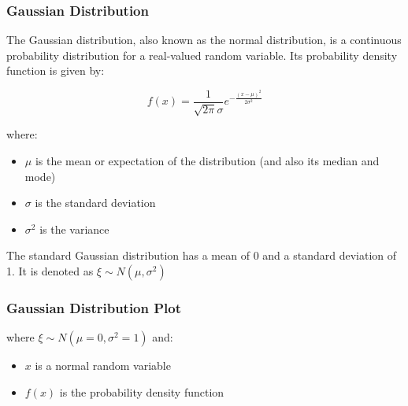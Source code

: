\documentclass[fullscreen=true, bookmarks=true, hyperref={pdfencoding=unicode}]{beamer}
\begin{document}
\begin{frame}
  \frametitle{Gaussian Distribution}
  
  The Gaussian distribution, also known as the normal distribution, is a continuous probability distribution for a real-valued random variable. Its probability density function is given by:
  
  \begin{equation*}
  f(x) = \frac{1}{\sqrt{2\pi}\sigma}e^{-\frac{(x-\mu)^2}{2\sigma^2}}
  \end{equation*}
  
  where:
  \begin{itemize}
  \pause\item $\mu$ is the mean or expectation of the distribution (and also its median and mode)
  \pause\item $\sigma$ is the standard deviation
  \pause\item $\sigma^2$ is the variance
  \end{itemize}

  \pause
  The standard Gaussian distribution has a mean of 0 and a standard deviation of 1.
  It is denoted as $\xi \sim N(\mu, \sigma^2)$
  
\end{frame}
  

\begin{frame}
  \frametitle{Gaussian Distribution Plot}
  
  \begin{center}
  \end{center}
  
  where $\xi \sim N(\mu=0, \sigma^2=1)$ and:
  \begin{itemize}
  \item $x$ is a normal random variable
  \item $f(x)$ is the probability density function
  \end{itemize}
\end{frame}
\end{document}
